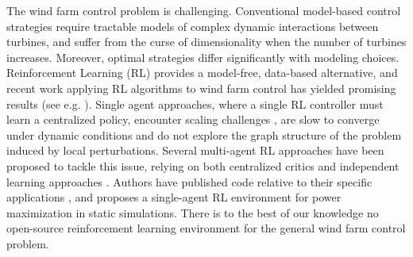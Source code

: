 \documentclass{article}
\newcommand{\jz}[1]{{\color{blue}#1}}
\newcommand{\md}[1]{{\color{red}#1}}
\begin{document}
The wind farm control problem is challenging. Conventional model-based control strategies require tractable models of complex dynamic interactions between turbines, and suffer from the curse of %
dimensionality when the number of turbines increases. Moreover, optimal strategies differ significantly with modeling choices.
Reinforcement Learning (RL) provides a model-free, data-based alternative,
and recent work applying RL algorithms to wind farm control has yielded promising results (see e.g. \cite{abkar2023_rlwfc}). 
Single agent approaches, where a single RL controller must learn a centralized policy, encounter scaling challenges \cite{dong2023reinforcement}, are slow to converge under dynamic conditions \cite{liew2023_rl} and do not explore the graph structure of the problem induced by local perturbations. Several multi-agent RL approaches have been proposed to tackle this issue, relying on both centralized critics \cite{deng2023decentralized,dong2023reinforcement,padullaparthi2022falcon} and independent learning approaches \cite{dfac, kadoche-marlyc, stanfel_qlearning}. Authors have published code relative to their specific applications \cite{verstraeten2019fleet,verstraeten2021scalable,neustroev2022deep}, and \cite{neustroev2022deep} proposes a single-agent RL environment for power maximization in static simulations. There is to the best of our knowledge no open-source reinforcement learning environment for the general wind farm control problem.
%
\end{document}

